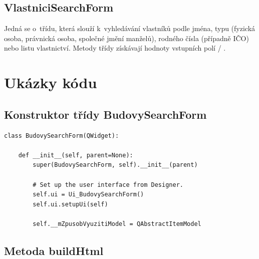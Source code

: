 \documentclass[a4paper,12pt,oneside]{book}
\begin{document}
\section*{VlastniciSearchForm}
Jedná se o~třídu, která slouží k~vyhledávání vlastníků podle jména,
typu (fyzická osoba, právnická osoba, společné jmění manželů), rodného
čísla (případně IČO) nebo listu vlastnictví. Metody třídy získávají
hodnoty vstupních polí / .



\chapter{Ukázky kódu}

\section{Konstruktor třídy BudovySearchForm}

{\scriptsize
\begin{lstlisting}[style=python, label=l_budovySearchForm_konstruktor]
class BudovySearchForm(QWidget):

    def __init__(self, parent=None):
        super(BudovySearchForm, self).__init__(parent)

        # Set up the user interface from Designer.
        self.ui = Ui_BudovySearchForm()
        self.ui.setupUi(self)

        self.__mZpusobVyuzitiModel = QAbstractItemModel
\end{lstlisting}
}

\section{Metoda buildHtml}
\end{document}
